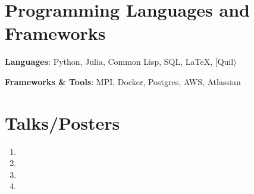 \documentclass[a4paper,10pt]{article}
\begin{document}
\section{Programming Languages and Frameworks}
\textbf{Languages}: Python, Julia, Common Lisp, SQL, \LaTeX, [Quil$\rangle$ 

\textbf{Frameworks \& Tools}: MPI, Docker, Postgres, AWS, Atlassian

%


\section{Talks/Posters}
\begin{enumerate}
\item {}
\item {}
\item {}
\item {}
\end{enumerate}
\end{document}

